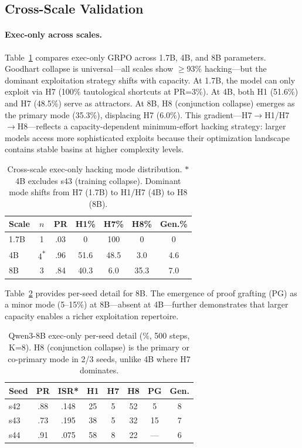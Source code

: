 \documentclass[11pt]{article}
\begin{document}
\subsection{Cross-Scale Validation}

\paragraph{Exec-only across scales.} Table~\ref{tab:cross-scale-exec} compares exec-only GRPO across 1.7B, 4B, and 8B parameters. Goodhart collapse is universal---all scales show $\geq$93\% hacking---but the dominant exploitation strategy shifts with capacity. At 1.7B, the model can only exploit via H7 (100\% tautological shortcuts at PR=3\%). At 4B, both H1 (51.6\%) and H7 (48.5\%) serve as attractors. At 8B, H8 (conjunction collapse) emerges as the primary mode (35.3\%), displacing H7 (6.0\%). This gradient---H7$\to$H1/H7$\to$H8---reflects a capacity-dependent minimum-effort hacking strategy: larger models access more sophisticated exploits because their optimization landscape contains stable basins at higher complexity levels.

\begin{table}[t]
\centering
\small
\begin{tabular}{lcccccc}
\toprule
Scale & $n$ & PR & H1\% & H7\% & H8\% & Gen.\% \\
\midrule
1.7B & 1 & .03 & 0 & 100 & 0 & 0 \\
4B & 4\textsuperscript{$\ast$} & .96 & 51.6 & 48.5 & 3.0 & 4.6 \\
8B & 3 & .84 & 40.3 & 6.0 & 35.3 & 7.0 \\
\bottomrule
\end{tabular}
\caption{Cross-scale exec-only hacking mode distribution. $\ast$4B excludes s43 (training collapse). Dominant mode shifts from H7 (1.7B) to H1/H7 (4B) to H8 (8B).}
\label{tab:cross-scale-exec}
\end{table}

Table~\ref{tab:8b-detail} provides per-seed detail for 8B. The emergence of proof grafting (PG) as a minor mode (5--15\%) at 8B---absent at 4B---further demonstrates that larger capacity enables a richer exploitation repertoire.

\begin{table}[t]
\centering
\small
\begin{tabular}{lccccccc}
\toprule
Seed & PR & ISR* & H1 & H7 & H8 & PG & Gen. \\
\midrule
s42 & .88 & .148 & 25 & 5 & 52 & 5 & 8 \\
s43 & .73 & .195 & 38 & 5 & 32 & 15 & 7 \\
s44 & .91 & .075 & 58 & 8 & 22 & --- & 6 \\
\bottomrule
\end{tabular}
\caption{Qwen3-8B exec-only per-seed detail (\%, 500 steps, K=8). H8 (conjunction collapse) is the primary or co-primary mode in 2/3 seeds, unlike 4B where H7 dominates.}
\label{tab:8b-detail}
\end{table}
\end{document}
